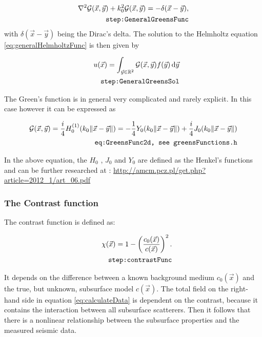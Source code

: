 \documentclass[10pt,a4paper]{article}
\newcommand{\df}[1]{\, \ensuremath{\mbox{d}#1}}
\begin{document}
\begin{align}
\label{eq:GeneralGreensFunc}
 \nabla^2 \mathcal{G}(\vec{x}, \vec{y}) + k_0^2
\mathcal{G}(\vec{x}, \vec{y}) = -\delta(\vec{x} -\vec{y}), \\
\tag*{\texttt{step:GeneralGreensFunc}}
\end{align}
with $\delta(\vec{x} - \vec{y})$ being the Dirac's delta.
The solution to the Helmholtz equation \eqref{eq:generalHelmholtzFunc} is then given by

\begin{align} \label{eq:GeneralGreensSol}
 u(\vec{x}) =
\int_{\vec{y} \in \mathbb{R}^2} \mathcal{G}(\vec{x}, \vec{y})
f(\vec{y}) \df{\vec{y}}\\
\tag*{\texttt{step:GeneralGreensSol}}
\end{align}

The Green's function is in general very complicated and rarely explicit. 
In this case however it can be expressed as

\begin{align} \label{eq:GreensFunc2d}
 \mathcal{G}(\vec{x}, \vec{y}) =
\frac{i}{4} H_0^{(1)}(k_0 \|\vec{x} - \vec{y}\|) =
-\frac{1}{4} Y_0(k_0 \|\vec{x} - \vec{y}\|) + \frac{i}{4}
J_0(k_0 \|\vec{x} - \vec{y}\|) \\
\tag*{\texttt{eq:GreensFunc2d, see greensFunctions.h}}
\end{align}

In the above equation, the $H_0$ , $J_0$ and $Y_0$ are defined as the
Henkel's functions and can be further researched at :
\url{http://amcm.pcz.pl/get.php?article=2012_1/art_06.pdf}



\subsubsection{The Contrast function}
The contrast function is defined as:

\begin{align} \label{eq:contrastFunc}\chi(\vec{x}) = 1 -
\left(\frac{c_0(\vec{x})}{c(\vec{x})} \right)^2.\\
\tag*{\texttt{step:contrastFunc}}
\end{align}

It depends on the difference between a known background medium
$c_\text{0}(\vec{x})$ and the true, but unknown, subsurface model
$c(\vec{x})$. The total field on the right-hand side in equation
\ref{eq:calculateData} is dependent on the contrast, because it contains the
interaction between all subsurface scatterers. Then it follows that
there is a nonlinear relationship between the subsurface properties
and the measured seismic data.
\end{document}
